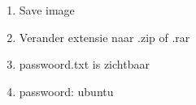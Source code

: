\begin{enumerate}
  \item Save image
  \item Verander extensie naar .zip of .rar
  \item passwoord.txt is zichtbaar
  \item passwoord: ubuntu
\end{enumerate}